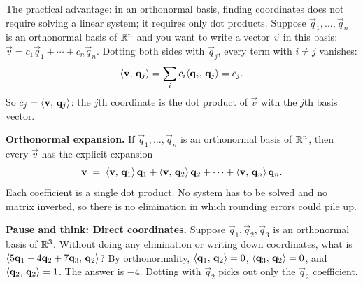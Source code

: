 The practical advantage: in an orthonormal basis, finding coordinates does not
require solving a linear system; it requires only dot products. Suppose
$\vec q_1,\dots,\vec q_n$ is an orthonormal basis of $\mathbb{R}^n$ and you want to write a vector
$\vec v$ in this basis:
$\vec v = c_1\vec q_1+\cdots+c_n\vec q_n$.
Dotting both sides with $\vec q_j$, every term with $i \neq j$ vanishes:
\[
  \langle \mathbf{v},\, \mathbf{q}_j \rangle = \sum_i c_i\langle \mathbf{q}_i,\, \mathbf{q}_j \rangle = c_j.
\]
So $c_j = \langle \mathbf{v},\, \mathbf{q}_j \rangle$: the $j$th coordinate is the dot product of $\vec v$
with the $j$th basis vector.

\begin{focusbox}
\textbf{Orthonormal expansion.} If $\vec q_1,\dots,\vec q_n$ is an orthonormal basis of $\mathbb{R}^n$,
then every $\vec v$ has the explicit expansion
\[
  \mathbf{v} \;=\; \langle \mathbf{v},\, \mathbf{q}_1 \rangle\,\mathbf{q}_1 + \langle \mathbf{v},\, \mathbf{q}_2 \rangle\,\mathbf{q}_2
            + \cdots + \langle \mathbf{v},\, \mathbf{q}_n \rangle\,\mathbf{q}_n .
\]
Each coefficient is a single dot product. No system has to be solved and no matrix inverted,
so there is no elimination in which rounding errors could pile up.
\end{focusbox}

\begin{recoverybox}
\textbf{Pause and think: Direct coordinates.} Suppose $\vec{q}_1,\vec{q}_2,\vec{q}_3$ is an
orthonormal basis of $\mathbb{R}^3$. Without doing any elimination or writing down coordinates, what is
$\langle 5\mathbf{q}_1 - 4\mathbf{q}_2 + 7\mathbf{q}_3,\, \mathbf{q}_2 \rangle$?
By orthonormality, $\langle \mathbf{q}_1,\, \mathbf{q}_2 \rangle=0$, $\langle \mathbf{q}_3,\, \mathbf{q}_2 \rangle=0$, and
$\langle \mathbf{q}_2,\, \mathbf{q}_2 \rangle=1$. The answer is $-4$. Dotting with $\vec q_2$ picks out only
the $\vec q_2$ coefficient.
\end{recoverybox}

